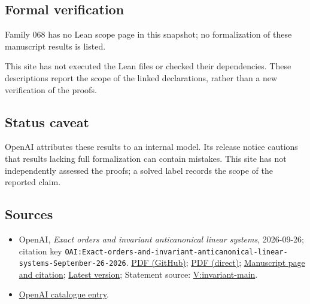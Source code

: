 \documentclass[11pt]{article}
\begin{document}
\subsection{Formal verification}
Family 068 has no Lean scope page in this snapshot; no formalization of these manuscript results is listed.

This site has not executed the Lean files or checked their dependencies. These descriptions report the scope of the linked declarations, rather than a new verification of the proofs.

\subsection{Status caveat}
OpenAI attributes these results to an internal model. Its release notice cautions that results lacking full formalization can contain mistakes. This site has not independently assessed the proofs; a solved label records the scope of the reported claim.

\subsection{Sources}
\begin{itemize}
\item OpenAI, \emph{Exact orders and invariant anticanonical linear systems}, 2026-09-26; citation key \texttt{OAI:Exact-orders-and-invariant-anticanonical-linear-systems-September-26-2026}. \href{https://github.com/openai/math/blob/adc7f1241b42e322a6451854ab7e4b4c146bf78a/preprints/Exact-orders-and-invariant-anticanonical-linear-systems-September-26-2026/main.pdf}{PDF (GitHub)}; \href{https://github.com/openai/math/raw/adc7f1241b42e322a6451854ab7e4b4c146bf78a/preprints/Exact-orders-and-invariant-anticanonical-linear-systems-September-26-2026/main.pdf}{PDF (direct)}; \href{https://github.com/openai/math/blob/adc7f1241b42e322a6451854ab7e4b4c146bf78a/preprints/Exact-orders-and-invariant-anticanonical-linear-systems-September-26-2026/README.md}{Manuscript page and citation}; \href{https://github.com/openai/math/blob/main/preprints/Exact-orders-and-invariant-anticanonical-linear-systems-September-26-2026/main.pdf}{Latest version}; Statement source: \href{https://github.com/openai/math/blob/adc7f1241b42e322a6451854ab7e4b4c146bf78a/preprints/Exact-orders-and-invariant-anticanonical-linear-systems-September-26-2026/build/source/sections/introduction.tex\#L144}{V:invariant-main}.
\item \href{https://github.com/openai/math/blob/adc7f1241b42e322a6451854ab7e4b4c146bf78a/CONTENTS.md}{OpenAI catalogue entry}.
\end{itemize}
\end{document}
